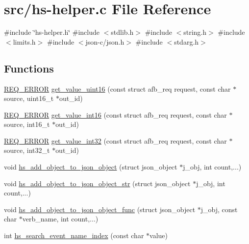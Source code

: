 \hypertarget{hs-helper_8c}{}\section{src/hs-\/helper.c File Reference}
\label{hs-helper_8c}
{\ttfamily \#include \char`\"{}hs-\/helper.\+h\char`\"{}}\newline
{\ttfamily \#include $<$stdlib.\+h$>$}\newline
{\ttfamily \#include $<$string.\+h$>$}\newline
{\ttfamily \#include $<$limits.\+h$>$}\newline
{\ttfamily \#include $<$json-\/c/json.\+h$>$}\newline
{\ttfamily \#include $<$stdarg.\+h$>$}\newline
\subsection*{Functions}
\begin{DoxyCompactItemize}
\item 
\hyperlink{hs-helper_8h_aa49f1dbbf26f01627a5737cf43aad899}{R\+E\+Q\+\_\+\+E\+R\+R\+OR} \hyperlink{hs-helper_8c_a649900645417f2df3a70b9ad67529f53}{get\+\_\+value\+\_\+uint16} (const struct afb\+\_\+req request, const char $\ast$source, uint16\+\_\+t $\ast$out\+\_\+id)
\item 
\hyperlink{hs-helper_8h_aa49f1dbbf26f01627a5737cf43aad899}{R\+E\+Q\+\_\+\+E\+R\+R\+OR} \hyperlink{hs-helper_8c_a2e62366684e39ea94436bf017e416827}{get\+\_\+value\+\_\+int16} (const struct afb\+\_\+req request, const char $\ast$source, int16\+\_\+t $\ast$out\+\_\+id)
\item 
\hyperlink{hs-helper_8h_aa49f1dbbf26f01627a5737cf43aad899}{R\+E\+Q\+\_\+\+E\+R\+R\+OR} \hyperlink{hs-helper_8c_ac5b0370643c520377afd3fd4891918d2}{get\+\_\+value\+\_\+int32} (const struct afb\+\_\+req request, const char $\ast$source, int32\+\_\+t $\ast$out\+\_\+id)
\item 
void \hyperlink{hs-helper_8c_a1ba31a6a94515ff1730ba0043a67d59e}{hs\+\_\+add\+\_\+object\+\_\+to\+\_\+json\+\_\+object} (struct json\+\_\+object $\ast$j\+\_\+obj, int count,...)
\item 
void \hyperlink{hs-helper_8c_a8777c53f1d4d5412f19b134ad85ffedf}{hs\+\_\+add\+\_\+object\+\_\+to\+\_\+json\+\_\+object\+\_\+str} (struct json\+\_\+object $\ast$j\+\_\+obj, int count,...)
\item 
void \hyperlink{hs-helper_8c_ae83604a37134e7bdee3ce4f10bb0b47a}{hs\+\_\+add\+\_\+object\+\_\+to\+\_\+json\+\_\+object\+\_\+func} (struct json\+\_\+object $\ast$j\+\_\+obj, const char $\ast$verb\+\_\+name, int count,...)
\item 
int \hyperlink{hs-helper_8c_a2ff1b894941c3b461ca8119079c4146a}{hs\+\_\+search\+\_\+event\+\_\+name\+\_\+index} (const char $\ast$value)
\end{DoxyCompactItemize}


